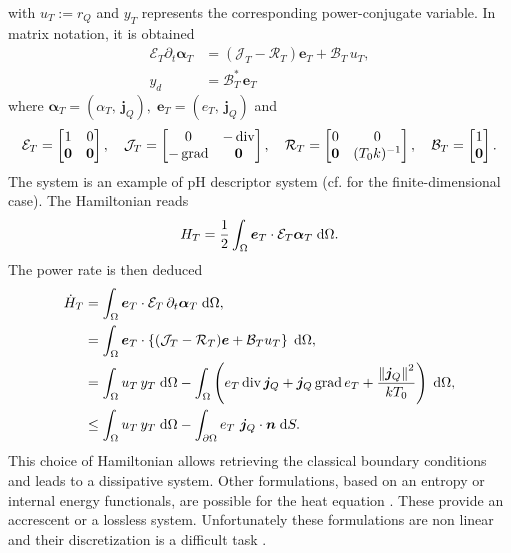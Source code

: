 with $u_T:=r_Q$ and $y_T$ represents the corresponding power-conjugate variable. In matrix notation, it is obtained
\begin{equation}
\begin{aligned}
\mathcal{E}_T \partial_{t} \bm{\alpha}_T  &= \left(\mathcal{J}_T - \mathcal{R}_T \right)\bm{e}_T + \mathcal{B}_{T}\, u_T, \\
y_d &= \mathcal{B}_{T}^* \, \bm{e}_T
\end{aligned}
\end{equation}
where $\bm{\alpha}_T = (\alpha_T,\ \bm{j}_Q), \; \bm{e}_T = (e_T,\ \bm{j}_Q)$ and
\begin{equation*}
\mathcal{E}_T = \begin{bmatrix}
1 & 0 \\
\bm{0} & \bm{0} \\
\end{bmatrix}, \quad
\mathcal{J}_T = \begin{bmatrix}
0 & -\operatorname{div} \\
-\operatorname*{grad} & \bm{0} \\
\end{bmatrix}, \quad 
\mathcal{R}_T = \begin{bmatrix}
0 & 0 \\
\bm{0} & (T_0 k)^{-1} \\
\end{bmatrix}, \quad
\mathcal{B}_T = \begin{bmatrix}
1 \\
\bm{0} \\
\end{bmatrix}.
\end{equation*}
The system is an example of pH descriptor system (cf. \cite{beattie2018linear} for the finite-dimensional case). The Hamiltonian reads 
\begin{equation}\label{eq:hamHeat}
	H_T = \frac{1}{2}\int_\Omega \bm{e}_T \cdot \mathcal{E}_T\bm{\alpha}_T \d\Omega.
\end{equation}
The power rate is then deduced
\begin{equation}\label{eq:enrateHeat}
\begin{aligned}
\dot{H}_T &= \int_\Omega \bm{e}_T \cdot \mathcal{E}_T\, \partial_t \bm{\alpha}_T \d\Omega, \\
		&= \int_\Omega \bm{e}_T \cdot \left\{(\mathcal{J}_T-\mathcal{R}_T) \bm{e} + \mathcal{B}_T u_T \right\} \d\Omega, \\
		&= \int_\Omega u_T \, y_T \d\Omega -\int_\Omega \left(e_T \div \bm{j}_Q + \bm{j}_Q \grad e_T + \frac{\norm{\bm{j}_Q}^2}{k T_0} \right) \d\Omega, \\
		&\le \int_\Omega u_T \, y_T \d\Omega -\int_{\partial\Omega} e_T \ \bm{j}_Q \cdot \bm{n} \d{S}.
\end{aligned}
\end{equation}
This choice of Hamiltonian allows retrieving the classical boundary conditions and leads to a dissipative system. Other formulations, based on an entropy or internal energy functionals, are possible for the heat equation \cite{duindam2009,serhani2019modeling}. These provide an accrescent or a lossless system. Unfortunately these formulations are non linear and their discretization is a difficult task \cite{serhani2019discretization}. 


